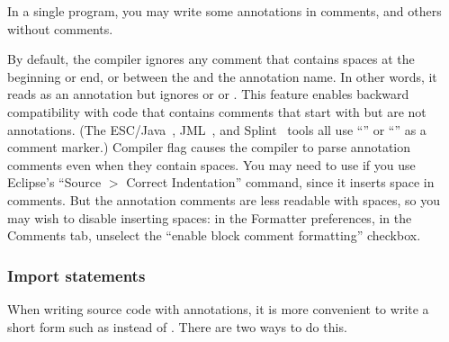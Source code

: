 In a single program, you may write some annotations in comments, and others
without comments.

By default, the compiler ignores any comment that contains spaces at the
beginning or end, or between the  and the annotation name.  
In other words, it reads  as an annotation but ignores
 or  or .
This
feature enables backward compatibility with code that contains comments
that start with  but are not annotations.  (The
ESC/Java~\cite{FlanaganLLNSS02}, JML~\cite{LeavensBR2006:JML}, and
Splint~\cite{Evans96} tools all use ``'' or ``'' as a
comment marker.)
Compiler flag
 causes the compiler to parse annotation comments
even when they contain spaces.  You may need to use
 if you use Eclipse's ``Source $>$ Correct
Indentation'' command, since it inserts space in comments.  But the
annotation comments are less readable with spaces, so you may wish to disable
inserting spaces:  in the Formatter preferences, in the Comments tab,
unselect the ``enable block comment formatting'' checkbox.


\subsubsection{Import statements\label{implicit-import-statements}}

When writing source code with annotations, it is more convenient to write a
short form such as  instead of
.  There are two ways to do this.

